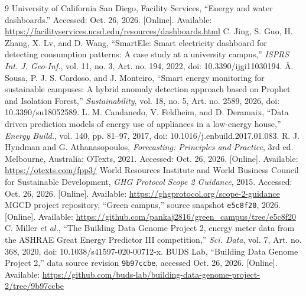 \documentclass[conference]{IEEEtran}
\begin{document}
\begin{thebibliography}{9}
 University of California San Diego, Facility Services, ``Energy and water dashboards.'' Accessed: Oct. 26, 2026. [Online]. Available: \url{https://facilityservices.ucsd.edu/resources/dashboards.html}
 C. Jing, S. Guo, H. Zhang, X. Lv, and D. Wang, ``SmartEle: Smart electricity dashboard for detecting consumption patterns: A case study at a university campus,'' \emph{ISPRS Int. J. Geo-Inf.}, vol. 11, no. 3, Art. no. 194, 2022, doi: 10.3390/ijgi11030194.
 \^{A}. Sousa, P. J. S. Cardoso, and J. Monteiro, ``Smart energy monitoring for sustainable campuses: A hybrid anomaly detection approach based on Prophet and Isolation Forest,'' \emph{Sustainability}, vol. 18, no. 5, Art. no. 2589, 2026, doi: 10.3390/su18052589.
 L. M. Candanedo, V. Feldheim, and D. Deramaix, ``Data driven prediction models of energy use of appliances in a low-energy house,'' \emph{Energy Build.}, vol. 140, pp. 81--97, 2017, doi: 10.1016/j.enbuild.2017.01.083.
 R. J. Hyndman and G. Athanasopoulos, \emph{Forecasting: Principles and Practice}, 3rd ed. Melbourne, Australia: OTexts, 2021. Accessed: Oct. 26, 2026. [Online]. Available: \url{https://otexts.com/fpp3/}
 World Resources Institute and World Business Council for Sustainable Development, \emph{GHG Protocol Scope 2 Guidance}, 2015. Accessed: Oct. 26, 2026. [Online]. Available: \url{https://ghgprotocol.org/scope-2-guidance}
 MGCD project repository, ``Green campus,'' source snapshot \texttt{e5c8f20}, 2026. [Online]. Available: \url{https://github.com/pankaj2816/green_campus/tree/e5c8f20}
 C. Miller \emph{et al.}, ``The Building Data Genome Project 2, energy meter data from the ASHRAE Great Energy Predictor III competition,'' \emph{Sci. Data}, vol. 7, Art. no. 368, 2020, doi: 10.1038/s41597-020-00712-x.
 BUDS Lab, ``Building Data Genome Project 2,'' data source revision \texttt{9b97ccbe}, accessed Oct. 26, 2026. [Online]. Available: \url{https://github.com/buds-lab/building-data-genome-project-2/tree/9b97ccbe}
\end{thebibliography}
\end{document}
